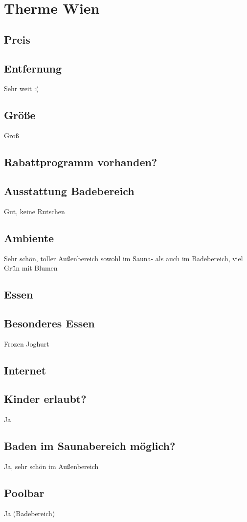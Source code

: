 \documentclass{article}
\begin{document}
\section*{Therme Wien}
\subsection*{Preis}
\subsection*{Entfernung} Sehr weit :(
\subsection*{Größe} Groß
\subsection*{Rabattprogramm vorhanden?}
\subsection*{Ausstattung Badebereich} Gut, keine Rutschen
\subsection*{Ambiente} Sehr schön, toller Außenbereich sowohl im Sauna- als auch im Badebereich, viel Grün mit Blumen
\subsection*{Essen}
\subsection*{Besonderes Essen} Frozen Joghurt
\subsection*{Internet}
\subsection*{Kinder erlaubt?} Ja
\subsection*{Baden im Saunabereich möglich?} Ja, sehr schön im Außenbereich
\subsection*{Poolbar} Ja (Badebereich)
\end{document}
